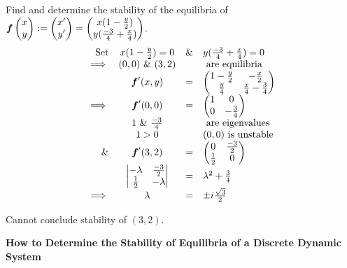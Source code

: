 \documentclass[11pt,a4paper]{article}
\begin{document}
\subtitle{Example}
Find and determine the stability of the equilibria of $\boldsymbol{f}\begin{pmatrix}x \\ y \end{pmatrix} := \begin{pmatrix}x' \\ y' \end{pmatrix} = \begin{pmatrix}x(1-\frac{y}{2}) \\ y(\frac{-3}{4} + \frac{x}{4}) \end{pmatrix}$.
\[\begin{array}{rccl}
\mathrm{Set}&x(1-\frac{y}{2}) = 0 &\&& y(\frac{-3}{4}+\frac{x}{4}) = 0\\
\implies&(0,0)\ \&\ (3,2) &&\mathrm{\ are\ equilibria}\\
&\boldsymbol{f}'(x, y)  &=& \begin{pmatrix}1-\frac{y}{2} & -\frac{x}{2} \\ \frac{y}{4} & \frac{x}{4} - \frac{3}{4} \end{pmatrix}\\
\implies& \boldsymbol{f}'(0,0)  &=& \begin{pmatrix}1 & 0 \\ 0 & - \frac{3}{4} \end{pmatrix}\\
& 1\ \&\ \frac{-3}{4} &&\mathrm{\ are\ eigenvalues}\\
& 1 > 0 && (0,0) \mathrm{\ is\ unstable}\\
\&& \boldsymbol{f}'(3,2)  &=& \begin{pmatrix}0 & \frac{-3}{2} \\ \frac{1}{2} & 0 \end{pmatrix}\\
&\begin{vmatrix} -\lambda & \frac{-3}{2} \\ \frac{1}{2} & -\lambda\end{vmatrix} &=& \lambda^2 + \frac{3}{4}\\
\implies& \lambda &=& \pm i\frac{\sqrt{3}}{2}\\
\end{array}\]
\begin{center}Cannot conclude stability of $(3, 2)$.\\\end{center}

\textbf{How to Determine the Stability of Equilibria of a Discrete Dynamic System}\\
\end{document}
